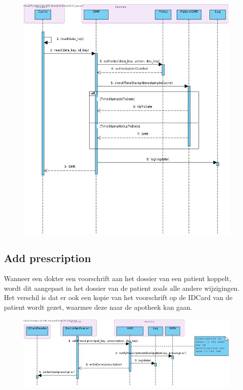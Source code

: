 \documentclass[a4paper,10pt]{article}
\begin{document}
\begin{center}
    \begin{figure}[!h]
      \includegraphics[width=\textwidth]{../images/retrieveGMR.jpg}
    \end{figure}
  \end{center}

\subsection{Add prescription}
Wanneer een dokter een voorschrift aan het dossier van een patient koppelt, wordt dit aangepast in het dossier van de patient zoals alle andere wijzigingen.
Het verschil is dat er ook een kopie van het voorschrift op de IDCard van de patient wordt gezet, waarmee deze naar de apotheek kan gaan. 

\begin{center}
    \begin{figure}[!h]
      \includegraphics[width=\textwidth]{../images/addprescription.jpg}
    \end{figure}
  \end{center}
\end{document}
